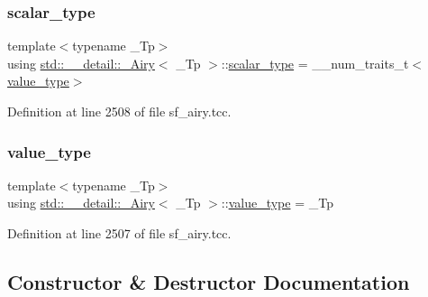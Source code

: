 \subsubsection{\texorpdfstring{scalar\+\_\+type}{scalar\_type}}
{\footnotesize\ttfamily template$<$typename \+\_\+\+Tp$>$ \\
using \hyperlink{classstd_1_1____detail_1_1__Airy}{std\+::\+\_\+\+\_\+detail\+::\+\_\+\+Airy}$<$ \+\_\+\+Tp $>$\+::\hyperlink{classstd_1_1____detail_1_1__Airy_a4b2b920ead7adcf08d49420c24e491b5}{scalar\+\_\+type} =  \+\_\+\+\_\+num\+\_\+traits\+\_\+t$<$\hyperlink{classstd_1_1____detail_1_1__Airy_a99e7e546930fbd7a846f6933a9b4b437}{value\+\_\+type}$>$}



Definition at line 2508 of file sf\+\_\+airy.\+tcc.

\mbox{\label{classstd_1_1____detail_1_1__Airy_a99e7e546930fbd7a846f6933a9b4b437}} 
\subsubsection{\texorpdfstring{value\+\_\+type}{value\_type}}
{\footnotesize\ttfamily template$<$typename \+\_\+\+Tp$>$ \\
using \hyperlink{classstd_1_1____detail_1_1__Airy}{std\+::\+\_\+\+\_\+detail\+::\+\_\+\+Airy}$<$ \+\_\+\+Tp $>$\+::\hyperlink{classstd_1_1____detail_1_1__Airy_a99e7e546930fbd7a846f6933a9b4b437}{value\+\_\+type} =  \+\_\+\+Tp}



Definition at line 2507 of file sf\+\_\+airy.\+tcc.



\subsection{Constructor \& Destructor Documentation}
\mbox{\label{classstd_1_1____detail_1_1__Airy_a7f9ac77b331e5fdf275923c66d833954}} 
